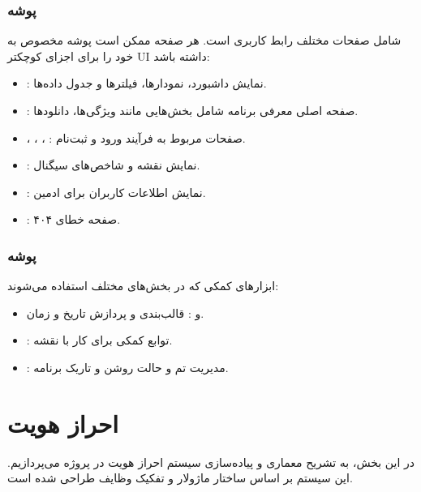     \subsubsection{پوشه }
    شامل صفحات مختلف رابط کاربری است. هر صفحه ممکن است پوشه  مخصوص به خود را برای اجزای کوچکتر UI داشته باشد:
    \begin{itemize}
    	\item {}: نمایش داشبورد، نمودارها، فیلترها و جدول داده‌ها.
    	\item {}: صفحه اصلی معرفی برنامه شامل بخش‌هایی مانند ویژگی‌ها، دانلودها.
    	\item {}، ، ، : صفحات مربوط به فرآیند ورود و ثبت‌نام.
    	\item {}: نمایش نقشه و شاخص‌های سیگنال.
    	\item {}: نمایش اطلاعات کاربران برای ادمین.
    	\item {}: صفحه خطای ۴۰۴.
    \end{itemize}
    
    \subsubsection{پوشه }
    ابزارهای کمکی که در بخش‌های مختلف استفاده می‌شوند:
    \begin{itemize}
    	\item {} و : قالب‌بندی و پردازش تاریخ و زمان.
    	\item {}: توابع کمکی برای کار با نقشه.
    	\item {}: مدیریت تم و حالت روشن و تاریک برنامه.
    \end{itemize}
    \section{احراز هویت}
    در این بخش، به تشریح معماری و پیاده‌سازی سیستم احراز هویت در پروژه می‌پردازیم. این سیستم بر اساس ساختار ماژولار و تفکیک وظایف  طراحی شده است.
